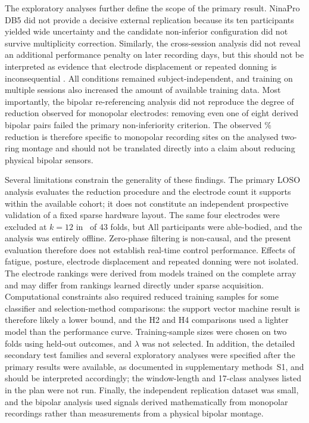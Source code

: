 The exploratory analyses further define the scope of the primary result. NinaPro DB5 did not provide a decisive external replication because its ten participants yielded wide uncertainty and the candidate non-inferior configuration did not survive multiplicity correction. Similarly, the cross-session analysis did not reveal an additional performance penalty on later recording days, but this should not be interpreted as evidence that electrode displacement or repeated donning is inconsequential \citep{hargrove2006effect,kaufmann2010fluctuating,vidovic2016improving}. All conditions remained subject-independent, and training on multiple sessions also increased the amount of available training data. Most importantly, the bipolar re-referencing analysis did not reproduce the degree of reduction observed for monopolar electrodes: removing even one of eight derived bipolar pairs failed the primary non-inferiority criterion. The observed \KStarReductionPct\% reduction is therefore specific to monopolar recording sites on the analysed two-ring montage and should not be translated directly into a claim about reducing physical bipolar sensors.

Several limitations constrain the generality of these findings. The primary LOSO analysis evaluates the reduction procedure and the electrode count it supports within the available cohort; it does not constitute an independent prospective validation of a fixed sparse hardware layout. The same four electrodes were excluded at $k = 12$ in \DroppedFourFolds\ of 43 folds, but  All participants were able-bodied, and the analysis was entirely offline. Zero-phase filtering is non-causal, and the present evaluation therefore does not establish real-time control performance. Effects of fatigue, posture, electrode displacement and repeated donning were not isolated. The electrode rankings were derived from models trained on the complete array and may differ from rankings learned directly under sparse acquisition. Computational constraints also required reduced training samples for some classifier and selection-method comparisons: the support vector machine result is therefore likely a lower bound, and the H2 and H4 comparisons used a lighter model than the performance curve. Training-sample sizes were chosen on two folds using held-out outcomes, and $\lambda$ was not selected. In addition, the detailed secondary test families and several exploratory analyses were specified after the primary results were available, as documented in supplementary methods~S1, and should be interpreted accordingly; the window-length and 17-class analyses listed in the plan were not run. Finally, the independent replication dataset was small, and the bipolar analysis used signals derived mathematically from monopolar recordings rather than measurements from a physical bipolar montage.

